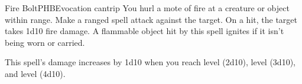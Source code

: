\begin{spell}{Fire Bolt}{PHB}{Evocation cantrip}
{
}
You hurl a mote of fire at a creature or object within
range. Make a ranged spell attack against the
target. On a hit, the target takes 1d10 fire damage. A
flammable object hit by this spell ignites if it isn't being
worn or carried.

 This spell's damage increases by
1d10 when you reach  level (2d10),  level (3d10),
and  level (4d10).
\end{spell}
